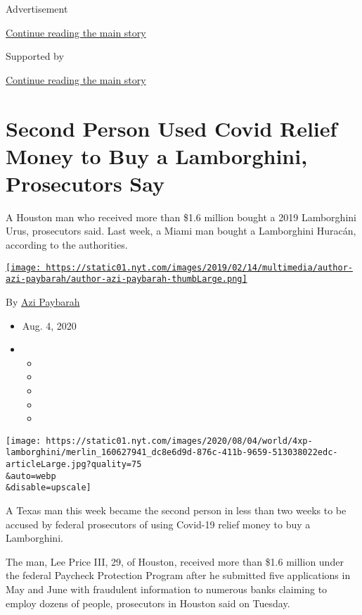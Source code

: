 Advertisement

\protect\hyperlink{after-top}{Continue reading the main story}

Supported by

\protect\hyperlink{after-sponsor}{Continue reading the main story}

\hypertarget{second-person-used-covid-relief-money-to-buy-a-lamborghini-prosecutors-say}{%
\section{Second Person Used Covid Relief Money to Buy a Lamborghini,
Prosecutors
Say}\label{second-person-used-covid-relief-money-to-buy-a-lamborghini-prosecutors-say}}

A Houston man who received more than \$1.6 million bought a 2019
Lamborghini Urus, prosecutors said. Last week, a Miami man bought a
Lamborghini Huracán, according to the authorities.

\href{https://www.nytimes.com/by/azi-paybarah}{\texttt{[image: https://static01.nyt.com/images/2019/02/14/multimedia/author-azi-paybarah/author-azi-paybarah-thumbLarge.png]}}

By \href{https://www.nytimes.com/by/azi-paybarah}{Azi Paybarah}

\begin{itemize}
\item
  Aug. 4, 2020
\item
  \begin{itemize}
  \item
  \item
  \item
  \item
  \item
  \end{itemize}
\end{itemize}

\texttt{[image: https://static01.nyt.com/images/2020/08/04/world/4xp-lamborghini/merlin\_160627941\_dc8e6d9d-876c-411b-9659-513038022edc-articleLarge.jpg?quality=75\\\&auto=webp\\\&disable=upscale]}

A Texas man this week became the second person in less than two weeks to
be accused by federal prosecutors of using Covid-19 relief money to buy
a Lamborghini.

The man, Lee Price III, 29, of Houston, received more than \$1.6 million
under the federal Paycheck Protection Program after he submitted five
applications in May and June with fraudulent information to numerous
banks claiming to employ dozens of people, prosecutors in Houston said
on Tuesday.


